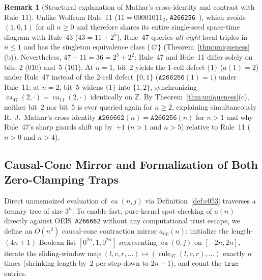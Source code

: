 \documentclass[11pt]{article}
\theoremstyle{definition}
\newtheorem{remark}[theorem]{Remark}
\newcommand{\Z}{\mathbb{Z}}
\newcommand{\seq}[1]{\texttt{#1}}
\newcommand{\ruleFS}{\operatorname{rule}_{47}}
\newcommand{\ca}{\operatorname{ca}}
\begin{document}
\begin{remark}[Structural explanation of Mathar's cross-identity and contrast with Rule~11]
\label{rem:mathar}
Unlike Wolfram Rule~11 ($11 = 00001011_2$, \seq{A266256}~\cite{oeis266256}), which avoids $(1, 0, 1)$ for all $n \ge 0$ and therefore shares its entire single-seed space-time diagram with Rule~43 ($43 = 11 + 2^5$), Rule~47 queries \emph{all eight} local triples in $n \le 1$ and has the singleton equivalence class $\{47\}$ (Theorem~\ref{thm:uniqueness}(b)). Nevertheless, $47 - 11 = 36 = 2^5 + 2^2$: Rule~47 and Rule~11 differ solely on bits~$2$ ($010$) and~$5$ ($101$). At $n = 1$, bit~$2$ yields the 1-cell defect $\{1\}$ ($a(1) = 2$) under Rule~47 instead of the 2-cell defect $\{0, 1\}$ ($\seq{A266256}(1) = 1$) under Rule~11; at $n = 2$, bit~$5$ widens $\{1\}$ into $\{1, 2\}$, synchronizing $\ca_{47}(2, \cdot) = \ca_{11}(2, \cdot)$ identically on $\Z$. By Theorem~\ref{thm:uniqueness}(c), neither bit~$2$ nor bit~$5$ is ever queried again for $n \ge 2$, explaining simultaneously R.~J.\ Mathar's cross-identity $\seq{A266662}(n) = \seq{A266256}(n)$ for $n > 1$ and why Rule~47's sharp guards shift up by~$+1$ ($n > 1$ and $n > 5$) relative to Rule~11 ($n > 0$ and $n > 4$).
\end{remark}

\subsection{Causal-Cone Mirror and Formalization of Both Zero-Clamping Traps}

Direct unmemoized evaluation of $\ca(n, j)$ via Definition~\ref{def:c053} traverses a ternary tree of size $3^n$. To enable fast, pure-kernel spot-checking of $a(n)$ directly against OEIS~\seq{A266662} without any computational trust escape, we define an $O(n^2)$ causal-cone contraction mirror $a_{\mathrm{dp}}(n)$: initialize the length-$(4n + 1)$ Boolean list $[0^{2n}, 1, 0^{2n}]$ representing $\ca(0, j)$ on $[-2n, 2n]$, iterate the sliding-window map $(l, c, r, \dots) \mapsto (\ruleFS(l, c, r), \dots)$ exactly $n$ times (shrinking length by~$2$ per step down to $2n + 1$), and count the $\mathtt{true}$ entries.
\end{document}
